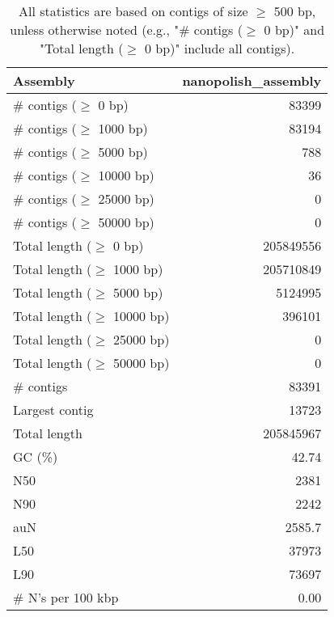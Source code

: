 \documentclass[12pt,a4paper]{article}
\begin{document}
\begin{table}[ht]
\begin{center}
\caption{All statistics are based on contigs of size $\geq$ 500 bp, unless otherwise noted (e.g., "\# contigs ($\geq$ 0 bp)" and "Total length ($\geq$ 0 bp)" include all contigs).}
\begin{tabular}{|l*{1}{|r}|}
\hline
Assembly & nanopolish\_assembly \\ \hline
\# contigs ($\geq$ 0 bp) & 83399 \\ \hline
\# contigs ($\geq$ 1000 bp) & 83194 \\ \hline
\# contigs ($\geq$ 5000 bp) & 788 \\ \hline
\# contigs ($\geq$ 10000 bp) & 36 \\ \hline
\# contigs ($\geq$ 25000 bp) & 0 \\ \hline
\# contigs ($\geq$ 50000 bp) & 0 \\ \hline
Total length ($\geq$ 0 bp) & 205849556 \\ \hline
Total length ($\geq$ 1000 bp) & 205710849 \\ \hline
Total length ($\geq$ 5000 bp) & 5124995 \\ \hline
Total length ($\geq$ 10000 bp) & 396101 \\ \hline
Total length ($\geq$ 25000 bp) & 0 \\ \hline
Total length ($\geq$ 50000 bp) & 0 \\ \hline
\# contigs & 83391 \\ \hline
Largest contig & 13723 \\ \hline
Total length & 205845967 \\ \hline
GC (\%) & 42.74 \\ \hline
N50 & 2381 \\ \hline
N90 & 2242 \\ \hline
auN & 2585.7 \\ \hline
L50 & 37973 \\ \hline
L90 & 73697 \\ \hline
\# N's per 100 kbp & 0.00 \\ \hline
\end{tabular}
\end{center}
\end{table}
\end{document}
